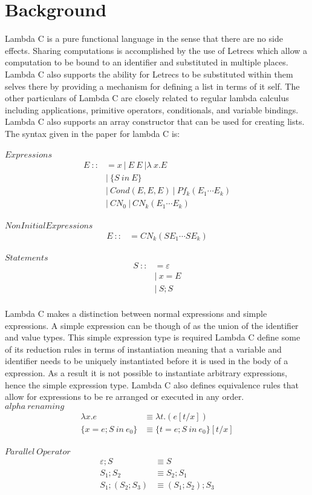 \documentclass[preprint, 10pt]{sigplanconf}
\begin{document}
\section{Background}
Lambda C is a pure functional language in the sense that there are no side effects. Sharing computations is accomplished by the use of Letrecs which allow a computation to be bound to an identifier and substituted in multiple places. Lambda C also supports the ability for Letrecs to be substituted within them selves there by providing a mechanism for defining a list in terms of it self. The other particulars of Lambda C are closely related to regular lambda calculus including applications, primitive operators, conditionals, and variable bindings. Lambda C also supports an array constructor that can be used for creating lists. The syntax given in the paper for lambda C is: 
\\
\\
$Expressions$ \cite{lambdas}
\begin{align}
E\ ::&= x\ |\ E\ E\ | \lambda\ x.E \\
&|\ \lbrace S\ in\ E \rbrace \\
&|\ Cond(E,E,E)\ |\ Pf_{k}(E_{1}\cdots E_{k}) \\
&|\ CN_{0}\ |\ CN_{k}(E_{1}\cdots E_{k}) 
\end{align}
\\
$Non Initial Expressions$
\begin{align}
E\ ::&= CN_{k}(SE_{1}\cdots SE_{k}) 
\end{align}
\\
$Statements$
\begin{align}
S\ ::&= \varepsilon\\
&|\ x = E\\
&|\ S;S 
\end{align}
\\
Lambda C makes a distinction between normal expressions and simple expressions. A simple expression can be though of as the union of the identifier and value types. This simple expression type is required Lambda C define some of its reduction rules in terms of instantiation meaning that a variable and identifier needs to be uniquely instantiated before it is used in the body of a expression. As a result it is not possible to instantiate arbitrary expressions, hence the simple expression type. Lambda C also defines equivalence rules that allow for expressions to be re arranged or executed in any order. 
\\
$alpha\ renaming$ 
\begin{align} 
\lambda x.e &\equiv \lambda t.(e[t/x]) \\
\lbrace x=e ; S\ in\ e_{0} \rbrace &\equiv \lbrace t = e; S\ in\ e_{0}  \rbrace [t/x]
\end{align}
\\
$Parallel\ Operator$
\begin{align}
\varepsilon ; S &\equiv S \\
S_{1} ; S_{2} &\equiv S_{2} ; S_{1}\\
S_{1} ; (S_{2} ; S_{3}) &\equiv (S_{1} ; S_{2}) ; S_{3}
\end{align}
\end{document}

